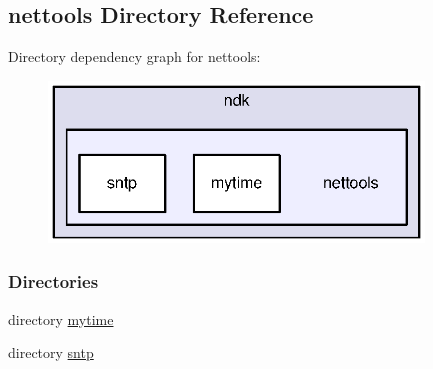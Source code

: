 \subsection{nettools Directory Reference}
\label{dir_8aa605f920672f9d1f8eefe318f025c9}
Directory dependency graph for nettools\+:
\nopagebreak
\begin{figure}[H]
\begin{center}
\leavevmode
\includegraphics[width=283pt]{dir_8aa605f920672f9d1f8eefe318f025c9_dep}
\end{center}
\end{figure}
\subsubsection*{Directories}
\begin{DoxyCompactItemize}
\item 
directory \hyperlink{dir_9195fb3778477ca4003b0c7d2a76ed27}{mytime}
\item 
directory \hyperlink{dir_0f16ffeaa3f2b1f072efa08face48775}{sntp}
\end{DoxyCompactItemize}
